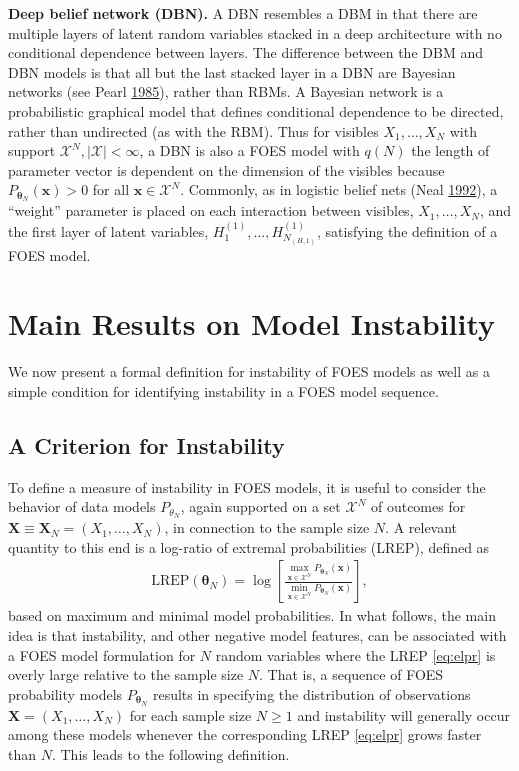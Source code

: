 \documentclass[]{article}
\theoremstyle{definition}
\newcommand{\REP}{\mathrm{LREP}}
\begin{document}
\textbf{Deep belief network (DBN).} A DBN resembles a DBM in that there
are multiple layers of latent random variables stacked in a deep
architecture with no conditional dependence between layers. The
difference between the DBM and DBN models is that all but the last
stacked layer in a DBN are Bayesian networks (see Pearl
\protect\hyperlink{ref-pearl985bayesian}{1985}), rather than RBMs. A
Bayesian network is a probabilistic graphical model that defines
conditional dependence to be directed, rather than undirected (as with
the RBM). Thus for visibles \(X_1, \dots, X_N\) with support
\(\mathcal{X}^N, \mid \mathcal{X} \mid < \infty\), a DBN is also a FOES
model with \(q(N)\) the length of parameter vector is dependent on the
dimension of the visibles because
\(P_{\boldsymbol \theta_N}(\boldsymbol x)>0\) for all
\(\boldsymbol x \in\mathcal{X}^N\). Commonly, as in logistic belief nets
(Neal \protect\hyperlink{ref-neal1992connectionist}{1992}), a ``weight''
parameter is placed on each interaction between visibles,
\(X_1, \dots, X_N\), and the first layer of latent variables,
\(H^{(1)}_1, \dots, H^{(1)}_{N_{(H,1)}}\), satisfying the definition of
a FOES model.

\section{Main Results on Model Instability}\label{instability-results}

We now present a formal definition for instability of FOES models as
well as a simple condition for identifying instability in a FOES model
sequence.

\subsection{A Criterion for Instability}\label{criterion}

To define a measure of instability in FOES models, it is useful to
consider the behavior of data models \(P_{\theta_N}\), again supported
on a set \(\mathcal{X}^N\) of outcomes for
\(\boldsymbol X\equiv \boldsymbol X_N =(X_1,\ldots,X_N)\), in connection
to the sample size \(N\). A relevant quantity to this end is a log-ratio
of extremal probabilities (LREP), defined as
\begin{align}
\label{eq:elpr}
 \REP (\boldsymbol \theta_N)  =  \log \left[\frac{\max\limits_{  \boldsymbol x\in \mathcal{X}^N}P_{\boldsymbol \theta_N}( \boldsymbol x)}{\min\limits_{ \boldsymbol x \in \mathcal{X}^N}P_{\boldsymbol \theta_N}( \boldsymbol x)}\right],
\end{align}
based on maximum and minimal model probabilities. In what follows, the
main idea is that instability, and other negative model features, can be
associated with a FOES model formulation for \(N\) random variables
where the LREP \eqref{eq:elpr} is overly large relative to the sample size
\(N\). That is, a sequence of FOES probability models
\(P_{\boldsymbol \theta_N}\) results in specifying the distribution of
observations \(\boldsymbol X=(X_1,\ldots,X_N)\) for each sample size
\(N \geq 1\) and instability will generally occur among these models
whenever the corresponding LREP \eqref{eq:elpr} grows faster than \(N\).
This leads to the following definition.
\end{document}
